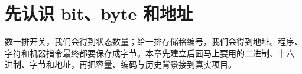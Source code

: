 \chapter{先认识 bit、byte 和地址}

数一排开关，我们会得到状态数量；给一排存储格编号，我们会得到地址。程序、
字符和机器指令最终都要保存成字节。本章先建立后面马上要用的二进制、十六
进制、字节和地址，再把容量、编码与历史背景接到真实项目。




